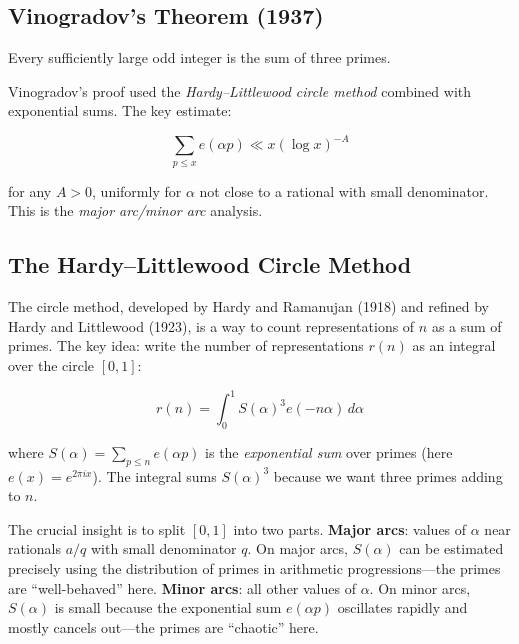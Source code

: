\subsection{Vinogradov's Theorem (1937)}

\begin{theorem}
Every sufficiently large odd integer is the sum of three primes.
\end{theorem}

Vinogradov's proof used the \emph{Hardy--Littlewood circle method} combined with exponential sums. The key estimate:

\begin{equation}
\label{eq:vinogradov-bound}
\sum_{p \leq x} e(\alpha p) \ll x(\log x)^{-A}
\end{equation}

for any $A > 0$, uniformly for $\alpha$ not close to a rational with small denominator. This is the \emph{major arc/minor arc} analysis.

\subsection{The Hardy--Littlewood Circle Method}

The circle method, developed by Hardy and Ramanujan (1918) and refined by Hardy and Littlewood (1923), is a way to count representations of $n$ as a sum of primes. The key idea: write the number of representations $r(n)$ as an integral over the circle $[0,1]$:

\begin{equation}
r(n) = \int_0^1 S(\alpha)^3 e(-n\alpha) \, d\alpha
\end{equation}

where $S(\alpha) = \sum_{p \leq n} e(\alpha p)$ is the \emph{exponential sum} over primes (here $e(x) = e^{2\pi i x}$). The integral sums $S(\alpha)^3$ because we want three primes adding to $n$.

The crucial insight is to split $[0,1]$ into two parts. \textbf{Major arcs}: values of $\alpha$ near rationals $a/q$ with small denominator $q$. On major arcs, $S(\alpha)$ can be estimated precisely using the distribution of primes in arithmetic progressions---the primes are ``well-behaved'' here. \textbf{Minor arcs}: all other values of $\alpha$. On minor arcs, $S(\alpha)$ is small because the exponential sum $e(\alpha p)$ oscillates rapidly and mostly cancels out---the primes are ``chaotic'' here.

